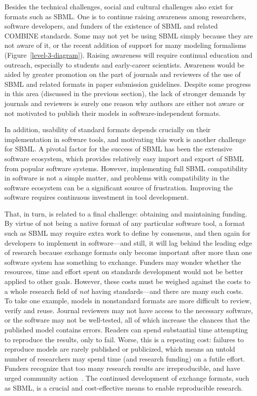 \documentclass{sbml-paper}
\begin{document}
Besides the technical challenges, social and cultural challenges also exist for formats such as SBML.  One is to continue raising awareness among researchers, software developers, and funders of the existence of SBML and related COMBINE standards.  Some may not yet be using SBML simply because they are not aware of it, or the recent addition of support for many modeling formalisms (Figure~\ref{level-3-diagram}).  Raising awareness will require continual education and outreach, especially to students and early-career scientists.  Awareness would be aided by greater promotion on the part of journals and reviewers of the use of SBML and related formats in paper submission guidelines.  Despite some progress in this area (discussed in the previous section), the lack of stronger demands by journals and reviewers is surely one reason why authors are either not aware or not motivated to publish their models in software-independent formats.

In addition, usability of standard formats depends crucially on their implementation in software tools, and motivating this work is another challenge for SBML.  A pivotal factor for the success of SBML has been the extensive software ecosystem, which provides relatively easy import and export of SBML from popular software systems.  However, implementing full SBML compatibility in software is not a simple matter, and problems with compatibility in the software ecosystem can be a significant source of frustration.  Improving the software requires continuous investment in tool development.

That, in turn, is related to a final challenge: obtaining and maintaining funding.  By virtue of not being a native format of any particular software tool, a format such as SBML may require extra work to define by consensus, and then again for developers to implement in software---and still, it will lag behind the leading edge of research because exchange formats only become important after more than one software system has something to exchange.  Funders may wonder whether the resources, time and effort spent on standards development would not be better applied to other goals.  However, these costs must be weighed against the costs to a whole research field of \emph{not} having standards---and there are many such costs.  To take one example, models in nonstandard formats are more difficult to review, verify and reuse.  Journal reviewers may not have access to the necessary software, or the software may not be well-tested, all of which increase the chances that the published model contains errors.  Readers can spend substantial time attempting to reproduce the results, only to fail.  Worse, this is a repeating cost: failures to reproduce models are rarely published or publicized, which means an untold number of researchers may spend time (and research funding) on a futile effort.  Funders recognize that too many research results are irreproducible, and have urged community action~\citep[e.g.,][]{Collins2014policy}.  The continued development of exchange formats, such as SBML, is a crucial and cost-effective means to enable reproducible research.
\end{document}
